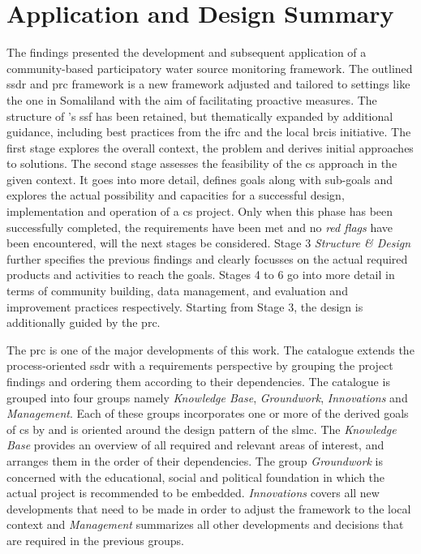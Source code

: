\section{Application and Design Summary}

The findings presented the development and subsequent application of a community-based participatory water source monitoring framework. The outlined \acrfull{ssdr} and \acrshort{prc} framework is a new framework adjusted and tailored to settings like the one in Somaliland with the aim of facilitating proactive measures.\newline
The structure of \citeauthor{fraislCitizenScienceEnvironmental2022}'s \citeyear{fraislCitizenScienceEnvironmental2022} \acrshort{ssf} has been retained, but thematically expanded by additional guidance, including best practices from the \acrshort{ifrc} and the local \acrshort{brcis} initiative. The first stage explores the overall context, the problem and derives initial approaches to solutions. The second stage assesses the feasibility of the \acrlong{cs} approach in the given context. It goes into more detail, defines goals along with sub-goals and explores the actual possibility and capacities for a successful design, implementation and operation of a \acrshort{cs} project. Only when this phase has been successfully completed, the requirements have been met and no \textit{red flags} have been encountered, will the next stages be considered. Stage 3 \textit{Structure \& Design} further specifies the previous findings and clearly focusses on the actual required products and activities to reach the goals. Stages 4 to 6 go into more detail in terms of community building, data management, and evaluation and improvement practices respectively. Starting from Stage 3, the design is additionally guided by the \acrfull{prc}. \newline

The \acrshort{prc} is one of the major developments of this work. The catalogue extends the process-oriented \acrshort{ssdr} with a requirements perspective by grouping the project findings and ordering them according to their dependencies. The catalogue is grouped into four groups namely \textit{Knowledge Base}, \textit{Groundwork}, \textit{Innovations} and \textit{Management}. Each of these groups incorporates one or more of the derived goals of \acrlong{cs} by \textcite{minkmanCitizenScienceWater2015} and is oriented around the design pattern of the \acrlong{slmc}. The \textit{Knowledge Base} provides an overview of all required and relevant areas of interest, and arranges them in the order of their dependencies. The group \textit{Groundwork} is concerned with the educational, social and political foundation in which the actual project is recommended to be embedded. \textit{Innovations} covers all new developments that need to be made in order to adjust the framework to the local context and \textit{Management} summarizes all other developments and decisions that are required in the previous groups.\newline

